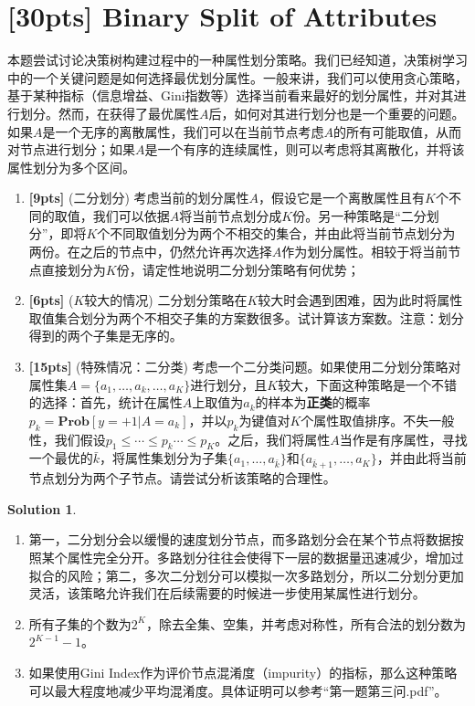 \documentclass[a4paper,UTF8]{article}
\theoremstyle{definition}
\newtheorem*{solution}{Solution}
\begin{document}
\newpage

\section{[30pts] Binary Split of Attributes}
本题尝试讨论决策树构建过程中的一种属性划分策略。我们已经知道，决策树学习中的一个关键问题是如何选择最优划分属性。一般来讲，我们可以使用贪心策略，基于某种指标（信息增益、Gini指数等）选择当前看来最好的划分属性，并对其进行划分。然而，在获得了最优属性$A$后，如何对其进行划分也是一个重要的问题。如果$A$是一个无序的离散属性，我们可以在当前节点考虑$A$的所有可能取值，从而对节点进行划分；如果$A$是一个有序的连续属性，则可以考虑将其离散化，并将该属性划分为多个区间。
\begin{enumerate}[(1)]
\item \textbf{[9pts]} (二分划分) 考虑当前的划分属性$A$，假设它是一个离散属性且有$K$个不同的取值，我们可以依据$A$将当前节点划分成$K$份。另一种策略是“二分划分”，即将$K$个不同取值划分为两个不相交的集合，并由此将当前节点划分为两份。在之后的节点中，仍然允许再次选择$A$作为划分属性。相较于将当前节点直接划分为$K$份，请定性地说明二分划分策略有何优势；
\item \textbf{[6pts]} ($K$较大的情况) 二分划分策略在$K$较大时会遇到困难，因为此时将属性取值集合划分为两个不相交子集的方案数很多。试计算该方案数。注意：划分得到的两个子集是无序的。
\item \textbf{[15pts]} (特殊情况：二分类) 考虑一个二分类问题。如果使用二分划分策略对属性集$A=\{a_1,\ldots,a_k,\ldots,a_K\}$进行划分，且$K$较大，下面这种策略是一个不错的选择：首先，统计在属性$A$上取值为$a_k$的样本为\textbf{正类}的概率$p_k=\textbf{Prob}[y=+1|A=a_k]$，并以$p_k$为键值对$K$个属性取值排序。不失一般性，我们假设$p_1\leq\cdots\leq p_k\cdots\leq p_K$。之后，我们将属性$A$当作是有序属性，寻找一个最优的$\bar{k}$，将属性集划分为子集$\{a_1,\ldots,a_{\bar{k}}\}$和$\{a_{\bar{k}+1},\ldots,a_K\}$，并由此将当前节点划分为两个子节点。请尝试分析该策略的合理性。
\end{enumerate}

\begin{solution}
\begin{enumerate}[(1)]
\item 第一，二分划分会以缓慢的速度划分节点，而多路划分会在某个节点将数据按照某个属性完全分开。多路划分往往会使得下一层的数据量迅速减少，增加过拟合的风险；第二，多次二分划分可以模拟一次多路划分，所以二分划分更加灵活，该策略允许我们在后续需要的时候进一步使用某属性进行划分。
\item 所有子集的个数为$2^K$，除去全集、空集，并考虑对称性，所有合法的划分数为$2^{K-1}-1$。
\item 如果使用Gini Index作为评价节点混淆度（impurity）的指标，那么这种策略可以最大程度地减少平均混淆度。具体证明可以参考“第一题第三问.pdf”。
\end{enumerate}
\end{solution}
\end{document}
